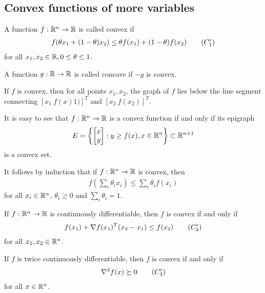 \subsection{Convex functions of more variables}

\begin{definition}
A function $f: \mathbb{R}^n \to \mathbb{R}$ is called convex if 
\begin{align}
f(\theta x_1 + (1-\theta) x_2) \le \theta f(x_1) + (1-\theta) f(x_2) \tag{$C_1'$} \labeq{C1p}
\end{align}
for all $x_1, x_2 \in \mathbb{R}, 0 \le \theta \le 1$.

A function $g: \mathbb{R} \to \mathbb{R}$ is called concave if $-g$ is convex.
\end{definition}

If $f$ is convex, then for all points $x_1, x_2$, the graph of $f$ lies below the line segment  connecting $[x_1 \ f(x)1)]^T$ and
$[x_2 \ f(x_2)]^T$.

It is easy to see that $f:\mathbb{R}^n \to \mathbb{R}$ is a convex function if and only if its epigraph
\begin{align}
E = \left\{ 
\begin{bmatrix}
x \\
y \\
\end{bmatrix} :
y \ge f(x), x \in \mathbb{R}^n
\right\} \subset \mathbb{R}^{n+1}
\end{align}
is a convex set.

\begin{remark}
It follows by induction that if $f: \mathbb{R}^n \to \mathbb{R}$ is convex, then
\begin{align}
f (\sum_{i} \theta_i x_i) \le \sum_{i} \theta_i f(x_i)
\end{align}
for all $x_i \in \mathbb{R}^n$, $\theta_i \ge 0$ and $\sum_{i} \theta_i = 1$.
\end{remark}

\begin{theorem}
If $f:\mathbb{R}^n \to \mathbb{R}$ is continuously differentiable, then $f$ is convex if and only if 
\begin{align}
f(x_1) + \grad f(x_1)^T (x_2 - x_1) \le f(x_2) \tag{$C_2'$} \labeq{C2p}
\end{align}
for all $x_1, x_2 \in \mathbb{R}^n$.

If $f$ is twice continuously differentiable, then $f$ is convex if and only if
\begin{align}
\grad ^2 f(x) \succeq 0 \tag{$C_3'$} \labeq{C3p}
\end{align}
for all $x \in \mathbb{R}^n$.
\end{theorem}

